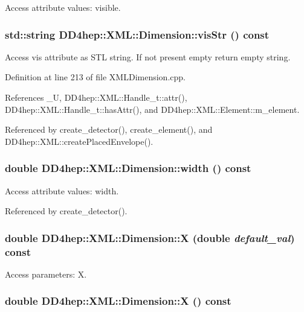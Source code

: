 Access attribute values: visible. \hypertarget{struct_d_d4hep_1_1_x_m_l_1_1_dimension_a9cabd4407763b0c9e334acdda19310ea}{
\subsubsection[{visStr}]{\setlength{\rightskip}{0pt plus 5cm}std::string DD4hep::XML::Dimension::visStr () const}}
\label{struct_d_d4hep_1_1_x_m_l_1_1_dimension_a9cabd4407763b0c9e334acdda19310ea}


Access vis attribute as STL string. If not present empty return empty string. 

Definition at line 213 of file XMLDimension.cpp.

References \_\-U, DD4hep::XML::Handle\_\-t::attr(), DD4hep::XML::Handle\_\-t::hasAttr(), and DD4hep::XML::Element::m\_\-element.

Referenced by create\_\-detector(), create\_\-element(), and DD4hep::XML::createPlacedEnvelope().\hypertarget{struct_d_d4hep_1_1_x_m_l_1_1_dimension_a908be6938052db121d089b619675e4d4}{
\subsubsection[{width}]{\setlength{\rightskip}{0pt plus 5cm}double DD4hep::XML::Dimension::width () const}}
\label{struct_d_d4hep_1_1_x_m_l_1_1_dimension_a908be6938052db121d089b619675e4d4}


Access attribute values: width. 

Referenced by create\_\-detector().\hypertarget{struct_d_d4hep_1_1_x_m_l_1_1_dimension_a428aa9f251c7af03e08dcb1ebf9b828a}{
\subsubsection[{X}]{\setlength{\rightskip}{0pt plus 5cm}double DD4hep::XML::Dimension::X (double {\em default\_\-val}) const}}
\label{struct_d_d4hep_1_1_x_m_l_1_1_dimension_a428aa9f251c7af03e08dcb1ebf9b828a}


Access parameters: X. \hypertarget{struct_d_d4hep_1_1_x_m_l_1_1_dimension_a883d1190b15a176135065e15140dac06}{
\subsubsection[{X}]{\setlength{\rightskip}{0pt plus 5cm}double DD4hep::XML::Dimension::X () const}}
\label{struct_d_d4hep_1_1_x_m_l_1_1_dimension_a883d1190b15a176135065e15140dac06}


